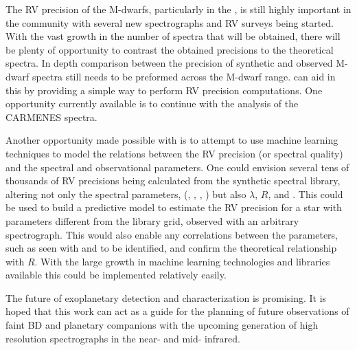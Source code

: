 The {RV} precision of the M-dwarfs, particularly in the \nir{}, is still highly important in the community with several new \nir{} spectrographs and {RV} surveys being started.
With the vast growth in the number of \nir{} spectra that will be obtained, there will be plenty of opportunity to contrast the obtained precisions to the theoretical spectra.
In depth comparison between the precision of synthetic and observed M-dwarf spectra still needs to be preformed across the M-dwarf range.
\Eniric{} can aid in this by providing a simple way to perform {RV} precision computations.
One opportunity currently available is to continue with the analysis of the {CARMENES} spectra.

Another opportunity made possible with \eniric{} is to attempt to use machine learning techniques to model the relations between the {RV} precision (or spectral quality) and the spectral and observational parameters.
One could envision several tens of thousands of {RV} precisions being calculated from the synthetic spectral library, altering not only the spectral parameters, (\Teff, \Logg{}, \feh{}, \alphafe{}) but also \(\lambda\), \(R\), \Vsini{} and \snr{}.
This could be used to build a predictive model to estimate the {RV} precision for a star with parameters different from the library grid, observed with an arbitrary spectrograph.
This would also enable any correlations between the parameters, such as seen with \Logg{} and \feh{} to be identified, and confirm the theoretical relationship with \(R\).
With the large growth in machine learning technologies and libraries available this could be implemented relatively easily.

The future of exoplanetary detection and characterization is promising.
It is hoped that this work can act as a guide for the planning of future observations of faint {BD} and planetary companions with the upcoming generation of high resolution spectrographs in the near- and mid- infrared.
